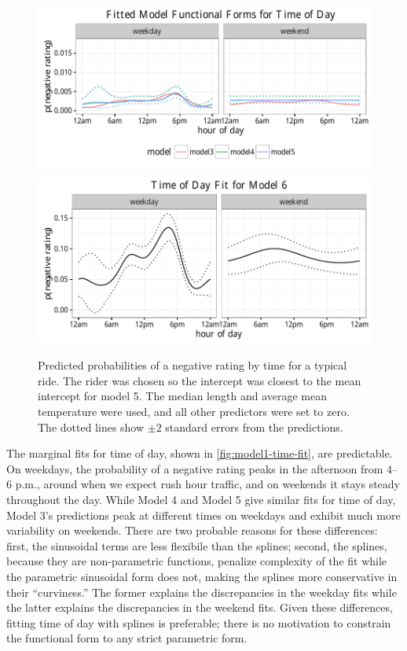 \documentclass[12pt,twoside]{reedthesis}
\begin{document}
  \begin{figure}[htb]
  \centering
  \includegraphics{figure/time_fit_plot.pdf}
  \includegraphics{figure/time_fit_plot_6.pdf}
  \caption{Predicted probabilities of a negative rating by time for a typical ride.
  The rider was chosen so the intercept was closest to the mean intercept for model
  5. The median length and average mean temperature were used, and all other
  predictors were set to zero. The dotted lines show $\pm 2$ standard errors from
  the predictions.}
  \end{figure}
  
  The marginal fits for time of day, shown in
  \autoref{fig:model1-time-fit}, are predictable. On weekdays, the
  probability of a negative rating peaks in the afternoon from 4--6 p.m.,
  around when we expect rush hour traffic, and on weekends it stays steady
  throughout the day. While Model 4 and Model 5 give similar fits for time
  of day, Model 3's predictions peak at different times on weekdays and
  exhibit much more variability on weekends. There are two probable
  reasons for these differences: first, the sinusoidal terms are less
  flexibile than the splines; second, the splines, because they are
  non-parametric functions, penalize complexity of the fit while the
  parametric sinusoidal form does not, making the splines more
  conservative in their ``curviness.'' The former explains the
  discrepancies in the weekday fits while the latter explains the
  discrepancies in the weekend fits. Given these differences, fitting time
  of day with splines is preferable; there is no motivation to constrain
  the functional form to any strict parametric form.
  
\end{document}
